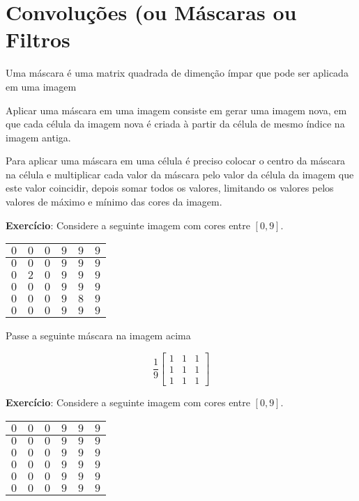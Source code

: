 \documentclass[12pt]{article}
\begin{document}
\break





\section{Convoluções (ou Máscaras ou Filtros}

Uma máscara é uma matrix quadrada de dimenção ímpar que pode ser aplicada em uma imagem

Aplicar uma máscara em uma imagem consiste em gerar uma imagem nova, em que cada célula da imagem nova é criada à partir da célula de mesmo índice na imagem antiga.

Para aplicar uma máscara em uma célula é preciso colocar o centro da máscara na célula e multiplicar cada valor da máscara pelo valor da célula da imagem que este valor coincidir, depois somar todos os valores, limitando os valores pelos valores de máximo e mínimo das cores da imagem.

\textbf{Exercício}: Considere a seguinte imagem com cores entre $[0, 9]$.

\begin{tabular}{|c|c|c|c|c|c|}
\hline
$0$ & $0$ & $0$ & $9$ & $9$ & $9$ \\ \hline
$0$ & $0$ & $0$ & $9$ & $9$ & $9$ \\ \hline
$0$ & $2$ & $0$ & $9$ & $9$ & $9$ \\ \hline
$0$ & $0$ & $0$ & $9$ & $9$ & $9$ \\ \hline
$0$ & $0$ & $0$ & $9$ & $8$ & $9$ \\ \hline
$0$ & $0$ & $0$ & $9$ & $9$ & $9$ \\ \hline

\end{tabular}

Passe a seguinte máscara na imagem acima

\[
\frac{1}{9}
\begin{bmatrix}
1 & 1 & 1\\
1 & 1 & 1\\
1 & 1 & 1
\end{bmatrix}
\]

\break

\textbf{Exercício}: Considere a seguinte imagem com cores entre $[0, 9]$.

\begin{tabular}{|c|c|c|c|c|c|}
\hline
$0$ & $0$ & $0$ & $9$ & $9$ & $9$ \\ \hline
$0$ & $0$ & $0$ & $9$ & $9$ & $9$ \\ \hline
$0$ & $0$ & $0$ & $9$ & $9$ & $9$ \\ \hline
$0$ & $0$ & $0$ & $9$ & $9$ & $9$ \\ \hline
$0$ & $0$ & $0$ & $9$ & $9$ & $9$ \\ \hline
$0$ & $0$ & $0$ & $9$ & $9$ & $9$ \\ \hline

\end{tabular}
\end{document}
